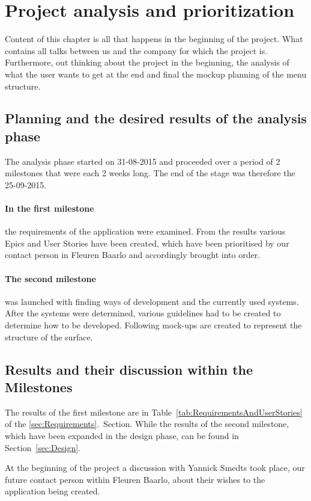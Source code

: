 \section{Project analysis and prioritization}
\label{analysis}
Content of this chapter is all that happens in the beginning of the project. What contains all talks between us and the company for which the project is. Furthermore, out thinking about the project in the beginning, the analysis of what the user wants to get at the end and final the mockup planning of the menu structure.

\subsection{Planning and the desired results of the analysis phase}
The analysis phase started on 31-08-2015 and proceeded over a period of 2 milestones that were each 2 weeks long. The end of the stage was therefore the 25-09-2015.

\paragraph{In the first milestone} the requirements of the application were examined. From the results various Epics and User Stories have been created, which have been prioritised by our contact person in Fleuren Baarlo and accordingly brought into order.

\paragraph{The second milestone} was launched with finding ways of development and the currently used systems. After the systems were determined, various guidelines had to be created to determine how to be developed.
Following mock-ups are created to represent the structure of the surface.

\subsection{Results and their discussion within the Milestones}
The results of the first milestone are in Table~\ref{tab:RequirementsAndUserStories} of the \ref{sec:Requirements}.~Section. While the results of the second milestone, which have been expanded in the design phase, can be found in Section~\ref{sec:Design}.

At the beginning of the project a discussion with Yannick Smedts took place, our future contact person within Fleuren Baarlo, about their wishes to the application being created.

